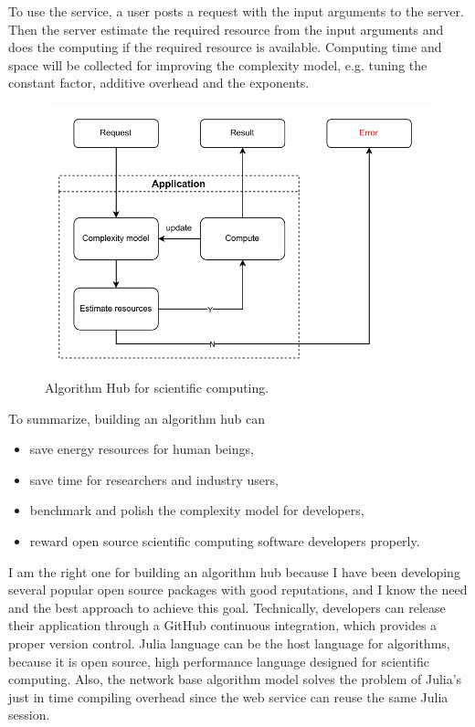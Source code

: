 \documentclass[a4paper]{article}
\newcommand{\<}{\langle}
\renewcommand{\>}{\rangle}
\begin{document}
To use the service, a user posts a request with the input arguments to the server. Then the server estimate the required resource from the input arguments and does the computing if the required resource is available.
Computing time and space will be collected for improving the complexity model, e.g. tuning the constant factor, additive overhead and the exponents.

\begin{figure}
    \centering
    \includegraphics[scale=0.8]{images/AlgorithmHub.pdf}
    \caption{Algorithm Hub for scientific computing.}
    \label{fig:alghub}
\end{figure}

To summarize, building an algorithm hub can
\begin{itemize}
    \item save energy resources for human beings,
    \item save time for researchers and industry users,
    \item benchmark and polish the complexity model for developers,
    \item reward open source scientific computing software developers properly.
\end{itemize}

I am the right one for building an algorithm hub because I have been developing several popular open source packages with good reputations, and I know the need and the best approach to achieve this goal.
Technically, developers can release their application through a GitHub continuous integration, which provides a proper version control.
Julia language can be the host language for algorithms, because it is open source, high performance language designed for scientific computing.
Also, the network base algorithm model solves the problem of Julia's just in time compiling overhead since the web service can reuse the same Julia session.
\end{document}
